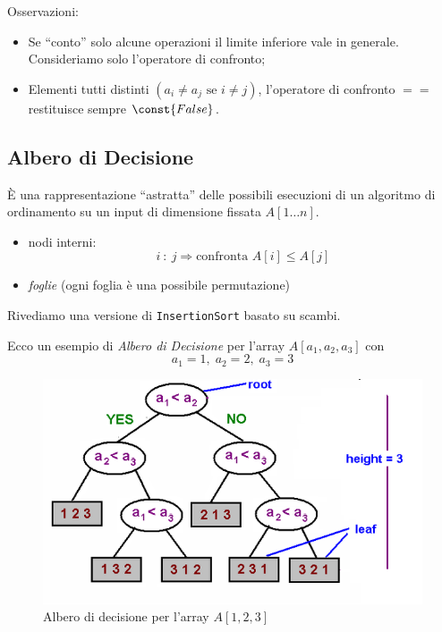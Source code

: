 Osservazioni:
\begin{itemize}[label=$\rightarrow$]
    \item Se ``conto'' solo alcune operazioni il limite inferiore
    vale in generale. Consideriamo solo l'operatore di confronto;
    \item Elementi tutti distinti $(a_i \neq a_j \text{ se } i \neq j)$,
    l'operatore di confronto $==$ restituisce sempre $\const{False}$.
\end{itemize}

\subsection{Albero di Decisione}

È una rappresentazione ``astratta'' delle possibili esecuzioni di un 
algoritmo di ordinamento su un input di dimensione fissata $A[1 \dots n]$.

\begin{itemize}[label=$\rightarrow$]
    \item nodi interni: 
    $$i \ : \ j \Rightarrow \text{confronta } A[i] \leq A[j]$$
    \item \emph{foglie} (ogni foglia è una possibile permutazione)
\end{itemize}

Rivediamo una versione di \texttt{InsertionSort} basato su scambi.

\clearpage
Ecco un esempio di \emph{Albero di Decisione} per l'array $A[a_1,a_2,a_3]$ 
con 
$$a_1 = 1, \; a_2 = 2, \; a_3 = 3$$
\begin{figure}[!hb] 
    \centering
    \includegraphics[width=\textwidth]{img/decision-tree.png}
    \caption{Albero di decisione per l'array $A[1,2,3]$}
\end{figure}

